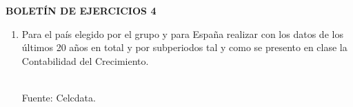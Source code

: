 \begin{center}	
\textbf{BOLETÍN DE EJERCICIOS 4}
\end{center}

\vspace{2cm}

\begin{enumerate}

    \item Para el país elegido por el grupo y para España realizar con los datos de los últimos 20 años en total y por subperiodos  tal y como se presento en clase la Contabilidad del Crecimiento.\\\\

    \begin{table}[htbp]
      \centering
      \caption{Contabilidad del crecimiento Española}
      \label{tab:addlabel}%
      \begin{center}
      \tiny Fuente: Celcdata.
      \end{center}
    \end{table}



\end{enumerate}
